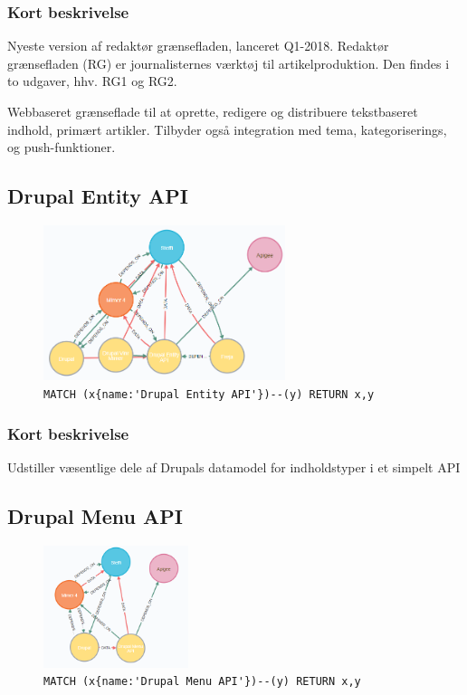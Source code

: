 \documentclass{article}
\begin{document}
\subsubsection*{Kort beskrivelse}
Nyeste version af redaktør grænsefladen, lanceret Q1-2018. Redaktør grænsefladen (RG) er journalisternes værktøj til artikelproduktion. Den findes i to udgaver, hhv. RG1 og RG2.	

Webbaseret grænseflade til at oprette, redigere og distribuere tekstbaseret indhold, primært artikler. Tilbyder også integration med tema, kategoriserings, og push-funktioner.



\subsection{Drupal Entity API}
\begin{figure}[H]
\includegraphics[width=200pt]{DrupalEntityAPI.PNG}
\cprotect\caption{\verb|MATCH (x{name:'Drupal Entity API'})--(y) RETURN x,y|}
\end{figure}
\subsubsection*{Kort beskrivelse}
Udstiller væsentlige dele af Drupals datamodel for indholdstyper i et simpelt API




\subsection{Drupal Menu API}
\begin{figure}[H]
\includegraphics[width=120pt]{DrupalMenuAPI.PNG}
\cprotect\caption{\verb|MATCH (x{name:'Drupal Menu API'})--(y) RETURN x,y|}
\end{figure}
\end{document}
